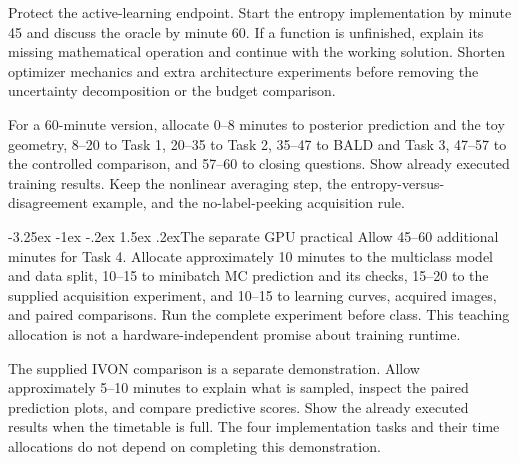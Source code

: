 \documentclass[11pt,a4paper]{article}
\makeatletter
\renewcommand\subsection{\@startsection{subsection}{2}{\z@}%
  {-3.25ex \@plus -1ex \@minus -.2ex}%
  {1.5ex \@plus .2ex}{\normalfont\large}}
\makeatother
\begin{document}
Protect the active-learning endpoint. Start the entropy implementation by
minute 45 and discuss the oracle by minute 60. If a function is unfinished,
explain its missing mathematical operation and continue with the working
solution. Shorten optimizer mechanics and extra architecture experiments
before removing the uncertainty decomposition or the budget comparison.

For a 60-minute version, allocate 0--8 minutes to posterior prediction and
the toy geometry, 8--20 to Task 1, 20--35 to Task 2, 35--47 to BALD and Task 3,
47--57 to the controlled comparison, and 57--60 to closing questions. Show
already executed training results. Keep the nonlinear averaging step, the
entropy-versus-disagreement example, and the no-label-peeking acquisition rule.

\subsection{The separate GPU practical}
Allow 45--60 additional minutes for Task 4. Allocate approximately 10 minutes
to the multiclass model and data split, 10--15 to minibatch MC prediction and
its checks, 15--20 to the supplied acquisition experiment, and 10--15 to
learning curves, acquired images, and paired comparisons. Run the complete
experiment before class. This teaching allocation is not a hardware-independent
promise about training runtime.

The supplied IVON comparison is a separate demonstration. Allow approximately
5--10 minutes to explain what is sampled, inspect the paired prediction plots,
and compare predictive scores. Show the already executed results when the
timetable is full. The four implementation tasks and their time allocations
do not depend on completing this demonstration.
\end{document}
